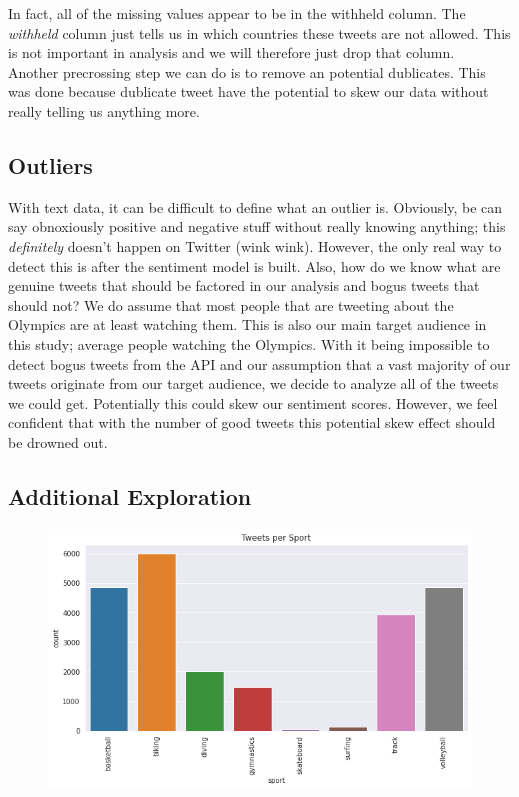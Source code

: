 \documentclass[12pt]{article}
\begin{document}
            In fact, all of the missing values appear to be in the withheld column. The \textit{withheld} column just tells us in which countries these tweets are not allowed. This is not
            important in analysis and we will therefore just drop that column. \\

            Another precrossing step we can do is to remove an potential dublicates. This was done because dublicate tweet have the potential to skew our data without really telling us 
            anything more.
        \subsection{Outliers}
            With text data, it can be difficult to define what an outlier is. Obviously, be can say obnoxiously positive and negative stuff without really knowing anything; this
            \textit{definitely} doesn't happen on Twitter (wink wink). However, the only real way to detect this is after the sentiment model is built. Also, how do we know what are
            genuine tweets that should be factored in our analysis and bogus tweets that should not? We do assume that most people that are tweeting about the Olympics are at least
            watching them. This is also our main target audience in this study; average people watching the Olympics. With it being impossible to detect bogus tweets from the API and
            our assumption that a vast majority of our tweets originate from our target audience, we decide to analyze all of the tweets we could get. Potentially this could skew our
            sentiment scores. However, we feel confident that with the number of good tweets this potential skew effect should be drowned out.
        \subsection{Additional Exploration}

            \begin{figure}
                \centering
                \includegraphics[scale=0.5]{sporttweet.png}
            \end{figure}
\end{document}
